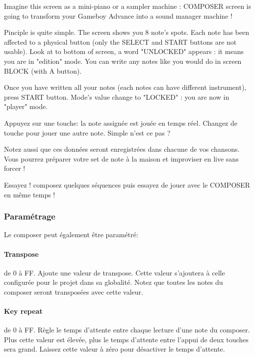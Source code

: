 Imagine this screen as a mini-piano or a sampler machine : COMPOSER screen is going to transform your Gameboy Advance into a sound manager machine !


Pinciple is quite simple.
The screen shows you 8 note's spots.
Each note has been affected to a physical button (only the SELECT and START buttons are not usable).
Look at to bottom of screen, a word "UNLOCKED" appears :
    it means you are in "edition" mode. You can write any notes like you would do in screen BLOCK (with A button).
\medskip

Once you have written all your notes (each notes can have different instrument), press START button.
Mode's value change to "LOCKED" : you are now in "player" mode.
\medskip

Appuyez sur une touche: la note assignée est jouée en temps réel.
Changez de touche pour jouer une autre note. Simple n'est ce pas ?
\medskip

Notez aussi que ces données seront enregistrées dans chacune de vos chansons.
Vous pourrez préparer votre set de note à la maison et improviser en live sans forcer !
\medskip

Essayez ! composez quelques séquences puis essayez de jouer avec le COMPOSER en même temps !
\medskip

\subsubsection{Paramétrage}

Le composer peut également être paramétré:


\paragraph{Transpose} de 0 à FF.
Ajoute une valeur de transpose.
Cette valeur s'ajoutera à celle configurée pour le projet dans sa globalité.
Notez que toutes les notes du composer seront transposées avec cette valeur.

\paragraph{Key repeat} de 0 à FF.
Règle le temps d'attente entre chaque lecture d'une note du composer.
Plus cette valeur est élevée, plus le temps d'attente entre l'appui de deux touches sera grand.
Laissez cette valeur à zéro pour désactiver le temps d'attente.

